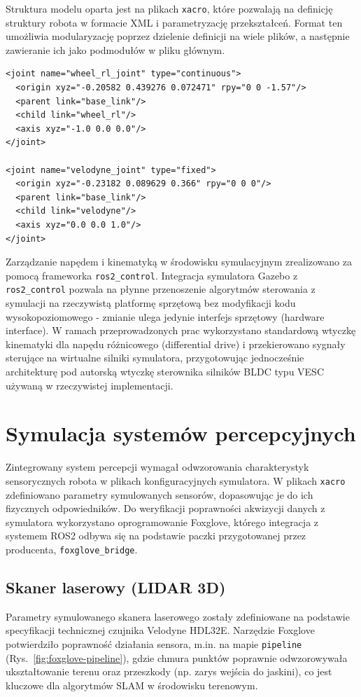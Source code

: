 \documentclass[a4paper,twoside,12pt]{book}
\begin{document}
Struktura modelu oparta jest na plikach \verb|xacro|, które pozwalają na definicję struktury robota w formacie XML i parametryzację przekształceń. Format ten umożliwia modularyzację poprzez dzielenie definicji na wiele plików, a następnie zawieranie ich jako podmodułów w pliku głównym.

\begin{listing}[h!]
\begin{verbatim}
<joint name="wheel_rl_joint" type="continuous">
  <origin xyz="-0.20582 0.439276 0.072471" rpy="0 0 -1.57"/>
  <parent link="base_link"/>
  <child link="wheel_rl"/>
  <axis xyz="-1.0 0.0 0.0"/>
</joint>

<joint name="velodyne_joint" type="fixed">
  <origin xyz="-0.23182 0.089629 0.366" rpy="0 0 0"/>
  <parent link="base_link"/>
  <child link="velodyne"/>
  <axis xyz="0.0 0.0 1.0"/>
</joint>
\end{verbatim}
\caption{Przykładowe definicje przegubów w formacie xacro}
\end{listing}

Zarządzanie napędem i kinematyką w środowisku symulacyjnym zrealizowano za pomocą frameworka \verb|ros2_control|. Integracja symulatora Gazebo z \verb|ros2_control| pozwala na płynne przenoszenie algorytmów sterowania z symulacji na rzeczywistą platformę sprzętową bez modyfikacji kodu wysokopoziomowego - zmianie ulega jedynie interfejs sprzętowy (hardware interface). W ramach przeprowadzonych prac wykorzystano standardową wtyczkę kinematyki dla napędu różnicowego (differential drive) i przekierowano sygnały sterujące na wirtualne silniki symulatora, przygotowując jednocześnie architekturę pod autorską wtyczkę sterownika silników BLDC typu VESC używaną w rzeczywistej implementacji.

\clearpage

\section{Symulacja systemów percepcyjnych}
Zintegrowany system percepcji wymagał odwzorowania charakterystyk sensorycznych robota w plikach konfiguracyjnych symulatora. W plikach \verb|xacro| zdefiniowano parametry symulowanych sensorów, dopasowując je do ich fizycznych odpowiedników. Do weryfikacji poprawności akwizycji danych z symulatora wykorzystano oprogramowanie Foxglove, którego integracja z systemem ROS2 odbywa się na podstawie paczki przygotowanej przez producenta, \verb|foxglove_bridge|.

\subsection{Skaner laserowy (LIDAR 3D)}
Parametry symulowanego skanera laserowego zostały zdefiniowane na podstawie specyfikacji technicznej czujnika Velodyne HDL32E. Narzędzie Foxglove potwierdziło poprawność działania sensora, m.in. na mapie \verb|pipeline| (Rys.~\ref{fig:foxglove-pipeline}), gdzie chmura punktów poprawnie odwzorowywała ukształtowanie terenu oraz przeszkody (np. zarys wejścia do jaskini), co jest kluczowe dla algorytmów SLAM w środowisku terenowym.
\end{document}

